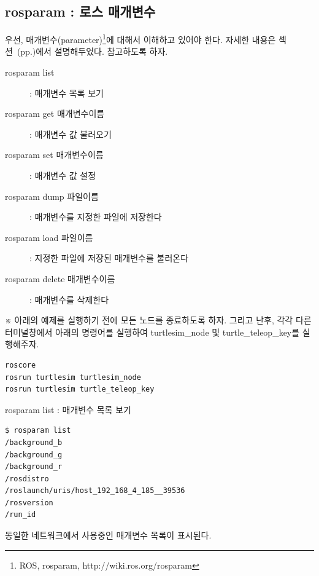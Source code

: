 \subsection{rosparam : 로스 매개변수}

우선, 매개변수(parameter)\footnote{ROS, rosparam, http://wiki.ros.org/rosparam}에 대해서 이해하고 있어야 한다. 자세한 내용은 섹션~(pp.\pageref{def:RosParameter})에서 설명해두었다. 참고하도록 하자.

\vspace{\baselineskip}
\noindent
\begin{description}
\item[rosparam list] : 매개변수 목록 보기
\item[rosparam get 매개변수이름] : 매개변수 값 불러오기
\item[rosparam set 매개변수이름] : 매개변수 값 설정 
\item[rosparam dump 파일이름] : 매개변수를 지정한 파일에 저장한다
\item[rosparam load 파일이름] : 지정한 파일에 저장된 매개변수를 불러온다
\item[rosparam delete 매개변수이름] : 매개변수를 삭제한다 
\end{description}

\vspace{\baselineskip}
\noindent
※ 아래의 예제를 실행하기 전에 모든 노드를 종료하도록 하자. 그리고 난후, 각각 다른 터미널창에서 아래의 명령어를 실행하여 turtlesim\_node 및 turtle\_teleop\_key를 실행해주자.

\begin{lstlisting}[language=ROS]
roscore
rosrun turtlesim turtlesim_node 
rosrun turtlesim turtle_teleop_key
\end{lstlisting}

\setcounter{num}{0}

\vspace{\baselineskip}
\noindent
{}\circled{\thenum} rosparam list : 매개변수 목록 보기

\begin{lstlisting}[language=ROS]
$ rosparam list
/background_b
/background_g
/background_r
/rosdistro
/roslaunch/uris/host_192_168_4_185__39536
/rosversion
/run_id
\end{lstlisting}

\noindent
동일한 네트워크에서 사용중인 매개변수 목록이 표시된다.

